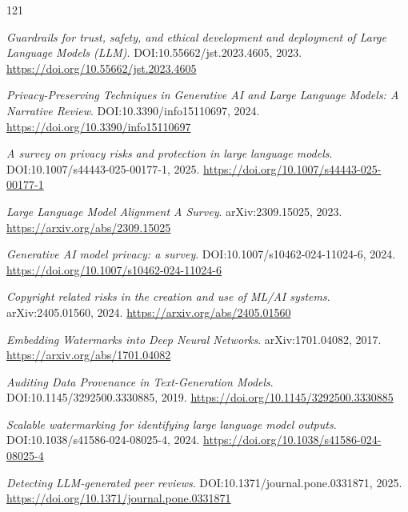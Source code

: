 \documentclass[11pt,a4paper]{article}
\begin{document}
\begin{thebibliography}{121}
\setlength{\itemsep}{2pt}

\newblock \emph{Guardrails for trust, safety, and ethical development and deployment of Large Language Models (LLM)}.
\newblock DOI:10.55662/jst.2023.4605, 2023.
\newblock \url{https://doi.org/10.55662/jst.2023.4605}

\newblock \emph{Privacy-Preserving Techniques in Generative AI and Large Language Models: A Narrative Review}.
\newblock DOI:10.3390/info15110697, 2024.
\newblock \url{https://doi.org/10.3390/info15110697}

\newblock \emph{A survey on privacy risks and protection in large language models}.
\newblock DOI:10.1007/s44443-025-00177-1, 2025.
\newblock \url{https://doi.org/10.1007/s44443-025-00177-1}

\newblock \emph{Large Language Model Alignment A Survey}.
\newblock arXiv:2309.15025, 2023.
\newblock \url{https://arxiv.org/abs/2309.15025}

\newblock \emph{Generative AI model privacy: a survey}.
\newblock DOI:10.1007/s10462-024-11024-6, 2024.
\newblock \url{https://doi.org/10.1007/s10462-024-11024-6}

\newblock \emph{Copyright related risks in the creation and use of ML/AI systems}.
\newblock arXiv:2405.01560, 2024.
\newblock \url{https://arxiv.org/abs/2405.01560}

\newblock \emph{Embedding Watermarks into Deep Neural Networks}.
\newblock arXiv:1701.04082, 2017.
\newblock \url{https://arxiv.org/abs/1701.04082}

\newblock \emph{Auditing Data Provenance in Text-Generation Models}.
\newblock DOI:10.1145/3292500.3330885, 2019.
\newblock \url{https://doi.org/10.1145/3292500.3330885}

\newblock \emph{Scalable watermarking for identifying large language model outputs}.
\newblock DOI:10.1038/s41586-024-08025-4, 2024.
\newblock \url{https://doi.org/10.1038/s41586-024-08025-4}

\newblock \emph{Detecting LLM-generated peer reviews}.
\newblock DOI:10.1371/journal.pone.0331871, 2025.
\newblock \url{https://doi.org/10.1371/journal.pone.0331871}


\end{thebibliography}
\end{document}
